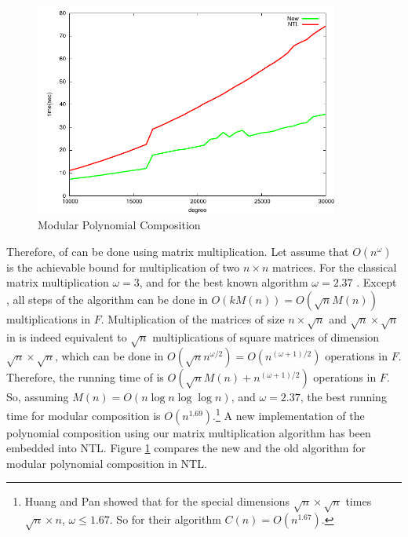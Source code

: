 \begin{figure}[ht]
\setlength{\abovecaptionskip}{-0.5cm}
\begin{center}
\includegraphics[width = 10cm]{figures/polyCompTiming.pdf}
\end{center}
\caption{\small Modular Polynomial Composition}
\label{figure:polyCompTiming}
\end{figure}

Therefore,  of  can be done using matrix 
multiplication. Let assume that $O(n^\omega)$ is the achievable bound for multiplication of two $n 
\times n$ matrices. For the classical matrix multiplication $\omega = 3$, and for the best known 
algorithm $\omega = 2.37$ \cite{Coppersmith1990}. Except , all steps of the 
algorithm can be done in $O(kM(n)) = O(\sqrt{n}M(n))$ multiplications in $F$. Multiplication of the 
matrices of size $n \times \sqrt{n}$ and $\sqrt{n} \times \sqrt{n}$ in  is 
indeed equivalent to $\sqrt{n}$ multiplications of square matrices of dimension $\sqrt{n} \times 
\sqrt{n}$, which can be done in $O(\sqrt{n}n^{\omega / 2}) = O(n^{(\omega + 1) / 2})$ operations in 
$F$. Therefore, the running time of  is $O(\sqrt{n}M(n) + 
n^{(\omega + 1) / 2})$ operations in $F$. So, assuming $M(n) = O(n\log n \log\log n)$, and $\omega = 
2.37$, the best running time for modular composition is $O(n^{1.69})$.\footnote{Huang and Pan 
\cite{Huang1997} showed that for the special dimensions $\sqrt{n} \times \sqrt{n}$ times $\sqrt{n} 
\times n$, $\omega \le 1.67$. So for their algorithm $C(n) = O(n^{1.67})$.} A new implementation of 
the polynomial composition using our matrix multiplication algorithm has been embedded into NTL. 
Figure \ref{figure:polyCompTiming} compares the new and the old algorithm for modular polynomial 
composition in NTL. 

